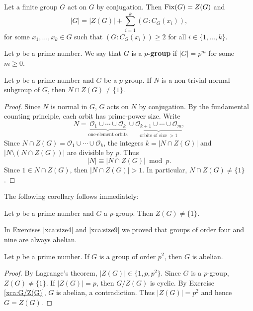 \begin{example}
Let a finite group $G$ act on $G$ by conjugation. 
Then $\operatorname{Fix}(G)=Z(G)$ and 
\[
|G|=|Z(G)|+\sum_{i=1}^k(G:C_G(x_i)),
\]
for some $x_1,\dots,x_k\in G$ such that 
$(G:C_G(x_i))\geq2$ for all $i\in\{1,\dots,k\}$.
\end{example}

\begin{definition}
Let $p$ be a prime number. We say 
that $G$ is a \textbf{$p$-group} if $|G|=p^m$ for some $m\geq0$.
\end{definition}

\begin{theorem}
Let $p$ be a prime number and 
$G$ be a $p$-group. If $N$ is a non-trivial normal subgroup of $G$, then
$N\cap Z(G)\ne\{1\}$.
\end{theorem}

\begin{proof}
Since $N$ is normal in $G$, $G$ acts on $N$ by conjugation. 
By the fundamental counting principle,
each orbit has prime-power size. Write 
\[
N=\underbrace{\mathcal{O}_1\cup\cdots\cup \mathcal{O}_k}_{\text{one-element orbits}}\cup\underbrace{\mathcal{O}_{k+1}\cup\cdots\cup\mathcal{O}_m}_{\text{orbits of size $>1$}},
\]
Since $N\cap Z(G)=\mathcal{O}_1\cup\cdots\cup\mathcal{O}_k$, 
the integers $k=|N\cap Z(G)|$ and $|N\setminus(N\cap Z(G))|$ are divisible by $p$. Thus 
\[
|N|\equiv|N\cap Z(G)|\bmod p.
\]
Since $1\in N\cap Z(G)$, then
$|N\cap Z(G)|>1$. In particular, $N\cap Z(G)\ne\{1\}$.
\end{proof}

The following corollary follows immediately: 

\begin{corollary}
Let $p$ be a prime number and 
$G$ a $p$-group. Then 
$Z(G)\ne\{1\}$.
\end{corollary}

In Exercises \ref{xca:size4} and \ref{xca:size9}
we proved that groups of order four and nine are always abelian. 

\begin{corollary}
    Let $p$ be a prime number. If $G$ is a group of order $p^2$, 
    then $G$ is abelian. 
\end{corollary}

\begin{proof}
By Lagrange's theorem, $|Z(G)|\in\{1,p,p^2\}$. Since $G$ 
is a $p$-group, $Z(G)\ne\{1\}$. If $|Z(G)|=p$, then $G/Z(G)$ 
is cyclic. By Exercise \ref{xca:G/Z(G)}, 
$G$ is abelian, a contradiction. 
Thus $|Z(G)|=p^2$ and hence $G=Z(G)$.
\end{proof}

